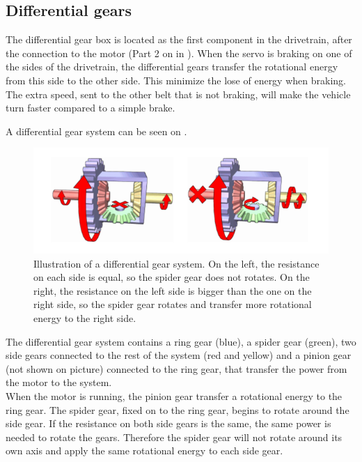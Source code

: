 \subsection{Differential gears} \label{sec:Differentialgears}

The differential gear box is located as the first component in the drivetrain, after the connection to the motor (Part 2 on  in ).
When the servo is braking on one of the sides of the drivetrain, the differential gears transfer the rotational energy from this side to the other side. This minimize the lose of energy when braking. The extra speed, sent to the other belt that is not braking, will make the vehicle turn faster compared to a simple brake.

A differential gear system can be seen on .

\begin{figure}[H]
	\centering
	\includegraphics[scale=0.7]{figures/diffGearLight}
	\caption{Illustration of a differential gear system. On the left, the resistance on each side is equal, so the spider gear does not rotates. On the right, the resistance on the left side is bigger than the one on the right side, so the spider gear rotates and transfer more rotational energy to the right side. \cite{MechanicalEngineering}}
	\label{diffGearLight}
\end{figure}

The differential gear system contains a ring gear (blue), a spider gear (green), two side gears connected to the rest of the system (red and yellow) and a pinion gear (not shown on picture) connected to the ring gear, that transfer the power from the motor to the system.\\

When the motor is running, the pinion gear transfer a rotational energy to the ring gear. The spider gear, fixed on to the ring gear, begins to rotate around the side gear. If the resistance on both side gears is the same, the same power is needed to rotate the gears. Therefore the spider gear will not rotate around its own axis and apply the same rotational energy to each side gear.\\

